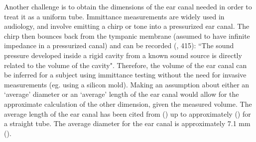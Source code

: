 \DIFdelbegin {}%

\DIFdelend Another challenge is to obtain the dimensions of the ear canal needed in order to treat it as a uniform tube\DIFaddbegin {}\DIFaddend . Immittance measurements are widely used in audiology, and involve emitting a chirp or tone into a pressurized ear canal.  The chirp then bounces back from the tympanic membrane (assumed to have infinite impedance in a pressurized canal) and can be recorded (\cite{ballachanda:97}, 415): ``The sound pressure developed inside a rigid cavity from a known sound source is directly related to the volume of the cavity".  Therefore, the volume of the ear canal can be inferred for a subject using immittance testing without the need for invasive measurements (eg. using a silicon mold).  Making an assumption about either an `average' diameter or an `average' length of the ear canal would allow for the approximate calculation of the other dimension, given the measured volume. The average length of the ear canal has been cited from \DIFdelbegin \DIFdel{23mm }\DIFdelend \DIFaddbegin \DIFadd{23 mm }\DIFaddend (\cite{rosen:91}) up to approximately \DIFdelbegin \DIFdel{29mm }\DIFdelend \DIFaddbegin \DIFadd{29 mm }\DIFaddend (\cite{stinson:89}) for a straight tube. The average diameter for the ear canal is approximately 7.1 mm (\cite{salvinelli:91}).

\DIFdelbegin %
{%
}

